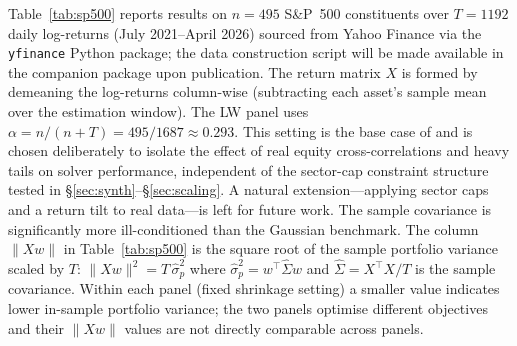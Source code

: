 \documentclass{siam/siamart}
\begin{document}
Table~\ref{tab:sp500} reports results on $n=495$ S\&P~500 constituents over $T=1192$
daily log-returns (July 2021--April 2026) sourced from Yahoo Finance via the
\texttt{yfinance} Python package; the data construction script will be made available
in the companion package \cite{fast_minimum_variance} upon publication.  The return matrix $X$ is formed by
demeaning the log-returns column-wise (subtracting each asset's sample mean over the
estimation window).  The LW panel uses $\alpha = n/(n+T) = 495/1687 \approx 0.293$.
This setting is the base case of \cite{minvar_paper}
and is chosen deliberately to isolate the effect of real equity cross-correlations and
heavy tails on solver performance, independent of the sector-cap constraint structure
tested in \S\ref{sec:synth}--\S\ref{sec:scaling}.  A natural extension---applying sector
caps and a return tilt to real data---is left for future work.  The sample covariance is
significantly more ill-conditioned than the Gaussian benchmark.  The column $\|Xw\|$
in Table~\ref{tab:sp500} is the square root of the sample portfolio variance scaled by
$T$: $\|Xw\|^2 = T\,\hat\sigma_p^2$ where $\hat\sigma_p^2 = w^\top\hat\Sigma w$ and
$\hat\Sigma = X^\top X / T$ is the sample covariance.  Within each panel (fixed
shrinkage setting) a smaller value indicates lower in-sample portfolio variance;
the two panels optimise different objectives and their $\|Xw\|$ values are not
directly comparable across panels.
\end{document}

